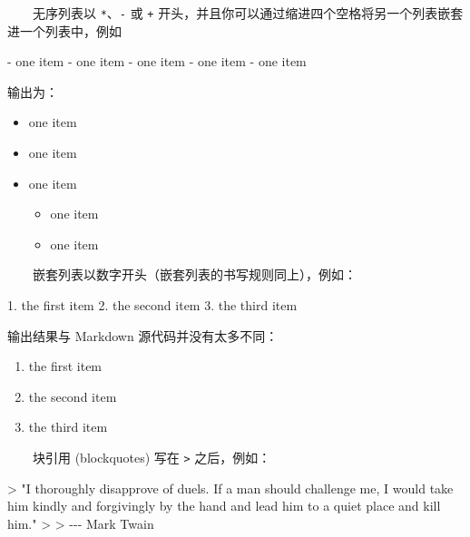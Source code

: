 \documentclass[
  12pt,
]{krantz}
\newenvironment{Shaded}{\begin{snugshade}}{\end{snugshade}}
\newcommand{\AttributeTok}[1]{\textcolor[rgb]{0.77,0.63,0.00}{#1}}
\newcommand{\NormalTok}[1]{#1}
\newcommand{\SpecialStringTok}[1]{\textcolor[rgb]{0.31,0.60,0.02}{#1}}
\providecommand{\tightlist}{%
  \setlength{\itemsep}{0pt}\setlength{\parskip}{0pt}}
\theoremstyle{definition}
\theoremstyle{definition}
\theoremstyle{definition}
\theoremstyle{definition}
\theoremstyle{remark}
\begin{document}
  无序列表以 \texttt{*}、\texttt{-} 或 \texttt{+} 开头，并且你可以通过缩进四个空格将另一个列表嵌套进一个列表中，例如

\begin{Shaded}
\begin{Highlighting}[]
\SpecialStringTok{{-} }\NormalTok{one item}
\SpecialStringTok{{-} }\NormalTok{one item}
\SpecialStringTok{{-} }\NormalTok{one item}
\SpecialStringTok{    {-} }\NormalTok{one item}
\SpecialStringTok{    {-} }\NormalTok{one item}
\end{Highlighting}
\end{Shaded}

输出为：

\begin{itemize}
\tightlist
\item
  one item
\item
  one item
\item
  one item

  \begin{itemize}
  \tightlist
  \item
    one item
  \item
    one item
  \end{itemize}
\end{itemize}

  嵌套列表以数字开头（嵌套列表的书写规则同上），例如：

\begin{Shaded}
\begin{Highlighting}[]
\SpecialStringTok{1. }\NormalTok{the first item}
\SpecialStringTok{2. }\NormalTok{the second item}
\SpecialStringTok{3. }\NormalTok{the third item}
\end{Highlighting}
\end{Shaded}

输出结果与 Markdown 源代码并没有太多不同：

\begin{enumerate}
\def\labelenumi{\arabic{enumi}.}
\tightlist
\item
  the first item
\item
  the second item
\item
  the third item
\end{enumerate}

  块引用 (blockquotes) 写在 \texttt{\textgreater{}} 之后，例如：

\begin{Shaded}
\begin{Highlighting}[]
\AttributeTok{\textgreater{} "I thoroughly disapprove of duels. If a man should challenge me,}
\AttributeTok{  I would take him kindly and forgivingly by the hand and lead him}
\AttributeTok{  to a quiet place and kill him."}
\AttributeTok{\textgreater{}}
\AttributeTok{\textgreater{} {-}{-}{-} Mark Twain}
\end{Highlighting}
\end{Shaded}
\end{document}
